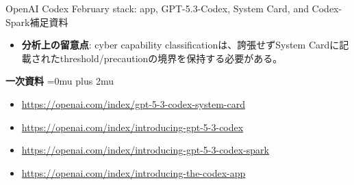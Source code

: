 \begin{technicalnote}{OpenAI Codex February stack: app, GPT-5.3-Codex, System Card, and Codex-Spark}{補足資料}
\begin{minipage}{\linewidth}
\begin{itemize}[leftmargin=1.5em,itemsep=0.35em]
\item \textbf{分析上の留意点}: cyber capability classificationは、誇張せずSystem Cardに記載されたthreshold/precautionの境界を保持する必要がある。
\end{itemize}
\begin{samepage}
{\bfseries 一次資料}
\begingroup\sloppy
\Urlmuskip=0mu plus 2mu\relax
\begin{itemize}[leftmargin=1.5em,itemsep=0.25em]
\item {\scriptsize\url{https://openai.com/index/gpt-5-3-codex-system-card}}
\item {\scriptsize\url{https://openai.com/index/introducing-gpt-5-3-codex}}
\item {\scriptsize\url{https://openai.com/index/introducing-gpt-5-3-codex-spark}}
\item {\scriptsize\url{https://openai.com/index/introducing-the-codex-app}}
\end{itemize}
\endgroup
\end{samepage}
\end{minipage}
\endgroup
\end{technicalnote}
\medskip

